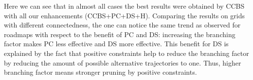 \documentclass[letterpaper]{article} %
\newcommand\roni[1]{\nb{\textbf{Roni:}}{orange}{#1}}
\newcommand{\ccbs}{\ac{CCBS}\xspace}
\newcommand{\pc}{\ac{PC}\xspace}
\newcommand{\ds}{\ac{DS}\xspace}
\begin{document}
Here we can see that in almost all cases %
the best results were obtained by \ccbs with all our enhancements (\ccbs+\pc+\ds+H). 
Comparing the results on grids with different connectedness, the one can notice the same trend as observed for roadmaps with respect to the benefit of \pc and \ds: increasing the branching factor makes \pc less effective and \ds more effective. %
This benefit for \ds is explained by the fact that positive constraints help to reduce the branching factor by reducing the amount of possible alternative trajectories to one. Thus, higher branching factor means stronger pruning by positive constraints. 






\end{document}
